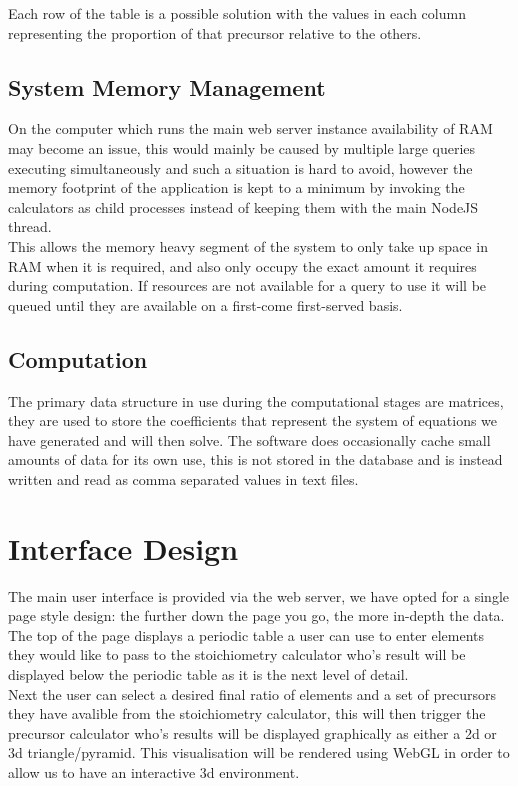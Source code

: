 \documentclass[a4paper, 12pt]{article}
\begin{document}
Each row of the table is a possible solution with the values in each column representing the proportion of that precursor relative to the others.

\subsection{System Memory Management}
On the computer which runs the main web server instance availability of RAM may become an issue, this would mainly be caused by multiple large queries executing simultaneously and such a situation is hard to avoid, however the memory footprint of the application is kept to a minimum by invoking the calculators as child processes instead of keeping them with the main NodeJS thread.\\

This allows the memory heavy segment of the system to only take up space in RAM when it is required, and also only occupy the exact amount it requires during computation. If resources are not available for a query to use it will be queued until they are available on a first-come first-served basis. 

\subsection{Computation}
The primary data structure in use during the computational stages are matrices, they are used to store the coefficients that represent the system of equations we have generated and will then solve. The software does occasionally cache small amounts of data for its own use, this is not stored in the database and is instead written and read as comma separated values in text files.

\section{Interface Design}
The main user interface is provided via the web server, we have opted for a single page style design: the further down the page you go, the more in-depth the data. \\

The top of the page displays a periodic table a user can use to enter elements they would like to pass to the stoichiometry calculator who's result will be displayed below the periodic table as it is the next level of detail.\\

Next the user can select a desired final ratio of elements and a set of precursors they have avalible from the stoichiometry calculator, this will then trigger the precursor calculator who's results will be displayed graphically as either a 2d or 3d triangle/pyramid. This visualisation will be rendered using WebGL in order to allow us to have an interactive 3d environment. \\
\end{document}
